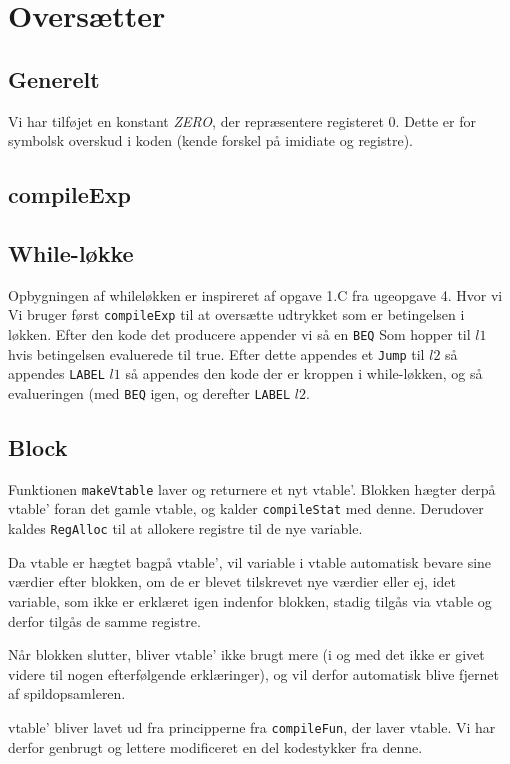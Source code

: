 \documentclass[a4paper, 10pt]{article}
\begin{document}
\section{Oversætter}

\subsection{Generelt}
Vi har tilføjet en konstant \textit{ZERO}, der repræsentere registeret 0. Dette
er for symbolsk overskud i koden (kende forskel på imidiate og registre).


\subsection{compileExp}


\subsection{While-løkke}
Opbygningen af whileløkken er inspireret af opgave 1.C fra ugeopgave 4. Hvor vi 
Vi bruger først \texttt{compileExp} til at oversætte udtrykket som er 
betingelsen i løkken. Efter den kode det producere appender vi så en 
\texttt{BEQ} Som hopper til $l1$ hvis betingelsen evaluerede til true. Efter 
dette appendes et \texttt{Jump} til $l2$ så appendes \texttt{LABEL} $l1$ så 
appendes den kode der er kroppen i while-løkken, og så evalueringen (med 
\texttt{BEQ} igen, og derefter \texttt{LABEL} $l2$.



\subsection{Block}
Funktionen \texttt{makeVtable} laver og returnere et nyt vtable'. Blokken
hægter derpå vtable' foran det gamle vtable, og kalder \texttt{compileStat} med
denne. Derudover kaldes \texttt{RegAlloc} til at allokere registre til de nye
variable.

Da vtable er hægtet bagpå vtable', vil variable i vtable automatisk bevare
sine værdier efter blokken, om de er blevet tilskrevet nye værdier eller ej,
idet variable, som ikke er erklæret igen indenfor blokken, stadig tilgås via
vtable og derfor tilgås de samme registre.

Når blokken slutter, bliver vtable' ikke brugt mere (i og med det ikke er givet
videre til nogen efterfølgende erklæringer), og vil derfor automatisk blive
fjernet af spildopsamleren.

vtable' bliver lavet ud fra principperne fra \texttt{compileFun}, der laver vtable. Vi har derfor genbrugt og lettere modificeret en del kodestykker fra denne.
\end{document}
